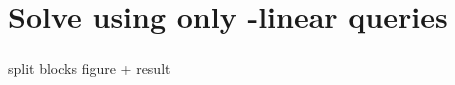 \section{Solve \kSUM{} using only -linear queries}
\begin{frame}\frametitle{\insertsection}\justifying
split blocks figure + result
\end{frame}

